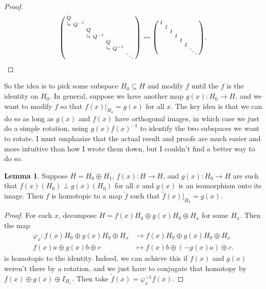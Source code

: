 \documentclass{shortart}
\theoremstyle{definition}
\newtheorem*{lemma}{Lemma}
\newcommand\rotarrow{\begin{tikzpicture}\draw (0.15, 0) -- (0, 0) -- (0, 0.15); \draw (0.1, 0.05) -- (0.15, 0) -- (0.1, -0.05);\end{tikzpicture}}
\newcommand\id{I}
\newenvironment{psmallmatrix}
  {\left(\begin{smallmatrix}}
  {\end{smallmatrix}\right)}
\begin{document}
\begin{proof}
\[\begin{psmallmatrix}
      Q \\
      \rotarrow & Q^{-1}\\
      & & Q\\
      & & \rotarrow & Q^{-1}\\
      & & & & Q\\
      & & & & \rotarrow & Q^{-1}\vspace{-5pt}\\
      & & & & & & \ddots
    \end{psmallmatrix}
    \rightsquigarrow
    \begin{psmallmatrix}
      \id \\
      & \id\\
      & & \id\\
      & & & \id\\
      & & & & \id\\
      & & & & & \id\vspace{-5pt}\\
      & & & & & & \ddots
    \end{psmallmatrix}.\qedshift
  \]
\end{proof}

So the idea is to pick some subspace $H_0 \subseteq H$ and modify $f$ until the $f$ is the identity on $H_0$. In general, suppose we have another map $g(x): H_0 \to H$, and we want to modify $f$ so that $f(x)|_{H_0} = g(x)$ for all $x$. The key idea is that we can do so as long as $g(x)$ and $f(x)$ have orthogonal images, in which case we just do a simple rotation, using $g(x) f(x)^{-1}$ to identify the two subspaces we want to rotate. I must emphasize that the actual result and proofs are much easier and more intuitive than how I wrote them down, but I couldn't find a better way to do so.
\begin{lemma}
  Suppose $H = H_0 \oplus H_1$, $f(x): H \to H$, and $g(x): H_0 \to H$ are such that $f(x)(H_0) \perp g(x)(H_0)$ for all $x$ and $g(x)$ is an isomorphism onto its image. Then $f$ is homotopic to a map $\tilde{f}$ such that $\tilde{f}(x)|_{H_0} = g(x)$.
\end{lemma}

\begin{proof}
  For each $x$, decompose $H = f(x)H_0 \oplus g(x) H_0 \oplus H_x$ for some $H_x$. Then the map
  \begin{align*}
    \varphi_x: f(x) H_0 \oplus g(x) H_0 \oplus H_x & \to f(x) H_0 \oplus g(x)H_0 \oplus H_x\\
    f(x) a \oplus g(x) b \oplus c &\mapsto f(x) b \oplus (-g(x)a) \oplus c.
  \end{align*}
  is homotopic to the identity. Indeed, we can achieve this if $f(x)$ and $g(x)$ weren't there by a rotation, and we just have to conjugate that homotopy by $f(x) \oplus g(x) \oplus \id_{H_x}$. Then take $\tilde{f}(x) = \varphi_x^{-1} f(x)$.
\end{proof}
\end{document}
